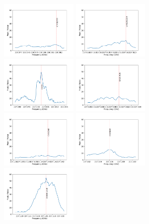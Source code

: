 \documentclass{aa}
\begin{document}
   \begin{figure}
    \includegraphics[width=0.33\textwidth]{spw0_(CH3)2CO}
    \includegraphics[width=0.33\textwidth]{spw0_c-H13CCCH}
    \includegraphics[width=0.33\textwidth]{spw0_C17O}
    \includegraphics[width=0.33\textwidth]{spw0_CH2CHCN}
    \includegraphics[width=0.33\textwidth]{spw0_CH3CHO}
    \includegraphics[width=0.33\textwidth]{spw0_CH3NH2}
    \includegraphics[width=0.33\textwidth]{spw0_CH3OHvt=0}

\end{figure}
\end{document}
